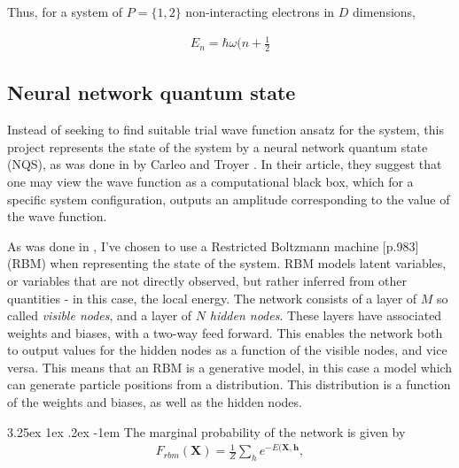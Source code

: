 \documentclass[%
oneside,                 %
final,                   %
10pt]{article}
\makeatletter
\renewcommand\paragraph{\@startsection{paragraph}{5}{\z@}%
  {3.25ex \@plus1ex \@minus.2ex}%
  {-1em}%
  {\normalfont\normalsize\bfseries}}
\makeatother
\begin{document}
Thus, for a system of $P=\{1,2\}$ non-interacting electrons in $D$ dimensions,

\begin{equation}
\begin{aligned}
E_n = \hbar \omega (n+\frac{1}{2}
\end{aligned}
\end{equation}



\subsection{Neural network quantum state}
Instead of seeking to find suitable trial wave function ansatz for the system, this project represents the state of the system by a neural network quantum state (NQS), as was done in by Carleo and Troyer \citep{CarleoGiuseppe2017Stqm}. In their article, they suggest that one may view the wave function as a computational black box, which for a specific system configuration, outputs an amplitude corresponding to the value of the wave function. 

As was done in \citep{CarleoGiuseppe2017Stqm}, I've chosen to use a Restricted Boltzmann machine \cite{MLMurphy}[p.983] (RBM) when representing the state of the system. RBM models latent variables, or variables that are not directly observed, but rather inferred from other quantities - in this case, the local energy. The network consists of a layer of $M$ so called \textit{visible nodes}, and a layer of $N$ \textit{hidden nodes}. These layers have associated weights and biases, with a two-way feed forward. This enables the network both to output values for the hidden nodes as a function of the visible nodes, and vice versa. This means that an RBM is a generative model, in this case a model which can generate particle positions from a distribution. This distribution is a function of the weights and biases, as well as the hidden nodes. 


\paragraph{The marginal probability of the network} is given by
\begin{equation*}
\begin{aligned}
F_{rbm}(\bm X) = \frac{1}{Z} \sum_h e^{-E(\bm X, \bm h} ,
\end{aligned}
\label{eq:TWF}
\end{equation*}
\end{document}
